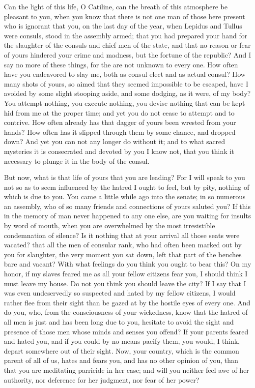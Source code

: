 \documentclass[a4paper]{amsbook}
\begin{document}
Can the light of this life, O Catiline, can the breath of this atmosphere be pleasant to you, when you know that there is not one man of those here present who is ignorant that you, on the last day of the year, when Lepidus and Tullus were consuls, stood in the assembly armed; that you had prepared your hand for the slaughter of the consuls and chief men of the state, and that no reason or fear of yours hindered your crime and madness, but the fortune of the republic? And I say no more of these things, for the are not unknown to every one. How often have you endeavored to slay me, both as consul-elect and as actual consul? How many shots of yours, so aimed that they seemed impossible to be escaped, have I avoided by some slight stooping aside, and some dodging, as it were, of my body? You attempt nothing, you execute nothing, you devise nothing that can be kept hid from me at the proper time; and yet you do not cease to attempt and to contrive. How often already has that dagger of yours been wrested from your hands? How often has it slipped through them by some chance, and dropped down? And yet you can not any longer do without it; and to what sacred mysteries it is consecrated and devoted by you I know not, that you think it necessary to plunge it in the body of the consul.

But now, what is that life of yours that you are leading? For I will speak to you not so as to seem influenced by the hatred I ought to feel, but by pity, nothing of which is due to you. You came a little while ago into the senate; in so numerous an assembly, who of so many friends and connections of yours saluted you? If this in the memory of man never happened to any one else, are you waiting for insults by word of mouth, when you are overwhelmed by the most irresistible condemnation of silence? Is it nothing that at your arrival all those seats were vacated? that all the men of consular rank, who had often been marked out by you for slaughter, the very moment you sat down, left that part of the benches bare and vacant? With what feelings do you think you ought to bear this? On my honor, if my slaves feared me as all your fellow citizens fear you, I should think I must leave my house. Do not you think you should leave the city? If I say that I was even undeservedly so suspected and hated by my fellow citizens, I would rather flee from their sight than be gazed at by the hostile eyes of every one. And do you, who, from the consciousness of your wickedness, know that the hatred of all men is just and has been long due to you, hesitate to avoid the sight and presence of those men whose minds and senses you offend? If your parents feared and hated you, and if you could by no means pacify them, you would, I think, depart somewhere out of their sight. Now, your country, which is the common parent of all of us, hates and fears you, and has no other opinion of you, than that you are meditating parricide in her case; and will you neither feel awe of her authority, nor deference for her judgment, nor fear of her power?
\end{document}
